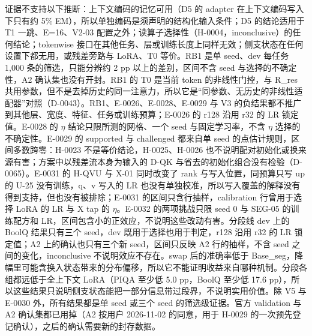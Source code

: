 \documentclass[11pt]{article}
\begin{document}
证据不支持以下推断：上下文编码的记忆可用（D5 的 adapter 在上下文编码写入下只有约 5\% EM），所以单独编码是须声明的结构化输入条件；D5 的结论适用于 T1 一跳、E=16、V2-03 配置之外；读算子选择性（H-0004，inconclusive）的任何结论；tokenwise 接口在其他任务、层或训练长度上同样无效；侧支状态在任何设置下都无用，或残差旁路与 LoRA、T0 等价。RB1 是单 seed、dev 每任务 1,000 条的筛选，只能分辨约 2 pp 以上的差别，区间不含 seed 与选择的不确定性，A2 确认集也没有开封。RB1 的 T0 是当前 token 的非线性门控，与 R\_res 共用参数，但不是去掉历史的同一注意力，所以它是``同参数、无历史的非线性适配器''对照（D-0043）。RB1、E-0026、E-0028、E-0029 与 V3 的负结果都不推广到其他层、宽度、特征、任务或训练预算；E-0026 的 r128 沿用 r32 的 LR 锁定值。E-0028 的 $\eta$ 结论只限所测的网格、一个 seed 与固定学习率，不含 $\eta$ 选择的不确定性。E-0029 的 supported 与 challenged 都来自单 seed 的点估计规则，区间多数跨零：H-0023 不是等价结论，H-0025、H-0026 也不说明配对初始化或换来源有害；方案中以残差流本身为输入的 D-QK 与省去的初始化组合没有检验（D-0065）。E-0031 的 H-QVU 与 X-01 同时改变了 rank 与写入位置，同预算只写 up 的 U-25 没有训练，q、v 写入的 LR 也没有单独校准，所以写入覆盖的解释没有得到支持，但也没有被排除；E-0031 的区间只含行抽样，calibration 行曾用于选择 LoRA 的 LR 与 X tap 的 $\eta$。E-0032 的两项挑战只限 seed 0 与 SEG-05 的训练配方和 LR，区间包含小的正效应，不说明这些改动有害。分段线 dev 上的 BoolQ 结果只有三个 seed，dev 既用于选择也用于判定，r128 沿用 r32 的 LR 锁定值；A2 上的确认也只有三个新 seed，区间只反映 A2 行的抽样，不含 seed 之间的变化，inconclusive 不说明效应不存在。swap 后的准确率低于 Base\_seg，降幅里可能含换入状态带来的分布偏移，所以它不能证明收益来自哪种机制。分段各组都远低于全上下文 LoRA（PIQA 至少低 5.0 pp，BoolQ 至少低 17.6 pp），所以这些结果只说明侧支状态能把一部分信息带过段界，不说明实用价值。除 V5 与 E-0030 外，所有结果都是单 seed 或三个 seed 的筛选级证据。官方 validation 与 A2 确认集都已用掉（A2 按用户 2026-11-02 的同意，用于 H-0029 的一次预先登记确认），之后的确认需要新的封存数据。
\end{document}
